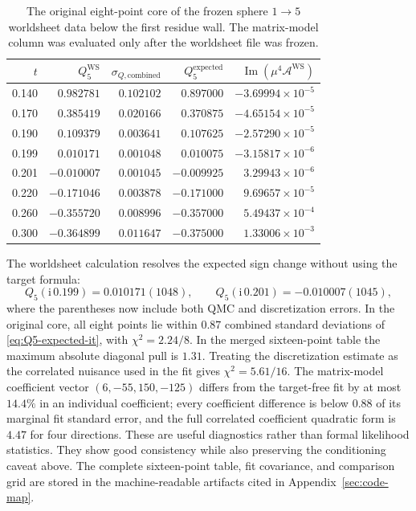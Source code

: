 \documentclass[11pt]{article}
\newcommand{\ii}{\mathrm{i}}
\newcommand{\A}{\mathcal{A}}
\begin{document}
\begin{table}[htbp]
\centering
\small
\caption{The original eight-point core of the frozen sphere $1\to5$
worldsheet data below the first residue wall.
The matrix-model column was evaluated only after the worldsheet file was
frozen.}
\label{tab:one-to-five-data}
\begin{tabular}{@{}r r r r r@{}}
\toprule
$t$ & $Q_5^{\mathrm{WS}}$ & $\sigma_{Q,\mathrm{combined}}$
& $Q_5^{\mathrm{expected}}$ & $\operatorname{Im}(\mu^4\A^{\mathrm{WS}})$ \\
\midrule
0.140 & $ 0.982781$ & $0.102102$ & $ 0.897000$ & $-3.69994\times10^{-5}$ \\
0.170 & $ 0.385419$ & $0.020166$ & $ 0.370875$ & $-4.65154\times10^{-5}$ \\
0.190 & $ 0.109379$ & $0.003641$ & $ 0.107625$ & $-2.57290\times10^{-5}$ \\
0.199 & $ 0.010171$ & $0.001048$ & $ 0.010075$ & $-3.15817\times10^{-6}$ \\
0.201 & $-0.010007$ & $0.001045$ & $-0.009925$ & $ 3.29943\times10^{-6}$ \\
0.220 & $-0.171046$ & $0.003878$ & $-0.171000$ & $ 9.69657\times10^{-5}$ \\
0.260 & $-0.355720$ & $0.008996$ & $-0.357000$ & $ 5.49437\times10^{-4}$ \\
0.300 & $-0.364899$ & $0.011647$ & $-0.375000$ & $ 1.33006\times10^{-3}$ \\
\bottomrule
\end{tabular}
\end{table}

The worldsheet calculation resolves the expected sign change without using
the target formula:
\begin{equation}
  Q_5(\ii\,0.199)=0.010171(1048),
  \qquad
  Q_5(\ii\,0.201)=-0.010007(1045),
\end{equation}
where the parentheses now include both QMC and discretization errors.  In the
original core, all eight points lie within $0.87$ combined standard
deviations of \eqref{eq:Q5-expected-it}, with $\chi^2=2.24/8$.  In the merged
sixteen-point table the maximum absolute diagonal pull is $1.31$.  Treating
the discretization estimate as the correlated nuisance used in the fit gives
$\chi^2=5.61/16$.  The matrix-model coefficient vector
$(6,-55,150,-125)$ differs from the target-free fit by at most $14.4\%$ in an
individual coefficient; every coefficient difference is below $0.88$ of its
marginal fit standard error, and the full correlated coefficient quadratic
form is $4.47$ for four directions.  These are useful diagnostics rather
than formal likelihood statistics.  They show good consistency while also
preserving the conditioning caveat above.  The complete sixteen-point table,
fit covariance, and comparison grid are stored in the machine-readable
artifacts cited in Appendix~\ref{sec:code-map}.
\end{document}
